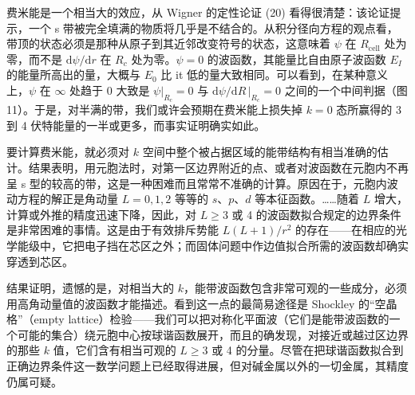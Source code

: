 费米能是一个相当大的效应，从 Wigner 的定性论证 (20) 看得很清楚：该论证提示，一个 s 带被完全填满的物质将几乎是不结合的。从积分径向方程的观点看，带顶的状态必须是那种从原子到其近邻改变符号的状态，这意味着 $\psi$ 在 $R_{\mathrm{cell}}$ 处为零，而不是 $\mathrm{d}\psi/\mathrm{d}r$ 在 $R_c$ 处为零。$\psi=0$ 的波函数，其能量比自由原子波函数 $E_I$ 的能量所高出的量，大概与 $E_0$ 比 it 低的量大致相同。可以看到，在某种意义上，$\psi$ 在 $\infty$ 处趋于 0 大致是 $\psi\big|_{R_c}=0$ 与 $\mathrm{d}\psi/\mathrm{d}R\,\big|_{R_c}=0$ 之间的一个中间判据（图 11）。于是，对半满的带，我们或许会预期在费米能上损失掉 $k=0$ 态所赢得的 3 到 4 伏特能量的一半或更多，而事实证明确实如此。


要计算费米能，就必须对 $k$ 空间中整个被占据区域的能带结构有相当准确的估计。结果表明，用元胞法时，对第一区边界附近的点、或者对波函数在元胞内不再呈 s 型的较高的带，这是一种困难而且常常不准确的计算。原因在于，元胞内波动方程的解正是角动量 $L=0,1,2$ 等等的 $s$、$p$、$d$ 等本征函数。……随着 $L$ 增大，计算或外推的精度迅速下降，因此，对 $L\geq 3$ 或 4 的波函数拟合规定的边界条件是非常困难的事情。这是由于有效排斥势能 $L(L+1)/r^2$ 的存在——在相应的光学能级中，它把电子挡在芯区之外；而固体问题中作边值拟合所需的波函数却确实穿透到芯区。

结果证明，遗憾的是，对相当大的 $k$，能带波函数包含非常可观的一些成分，必须用高角动量值的波函数才能描述。看到这一点的最简易途径是 Shockley 的“空晶格”（empty lattice）检验——我们可以把对称化平面波（它们是能带波函数的一个可能的集合）绕元胞中心按球谐函数展开，而且的确发现，对接近或越过区边界的那些 $k$ 值，它们含有相当可观的 $L\geq 3$ 或 4 的分量。尽管在把球谐函数拟合到正确边界条件这一数学问题上已经取得进展，但对碱金属以外的一切金属，其精度仍属可疑。

